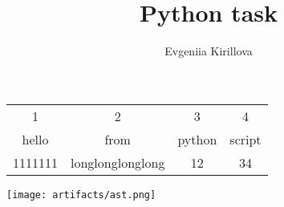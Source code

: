 \documentclass{article}
\title{Python task}
\author{Evgeniia Kirillova}
\begin{document}
\maketitle
\begin{center}\begin{tabular}{cccc}
1 & 2 & 3 & 4\\
hello & from & python & script\\
1111111 & longlonglonglong & 12 & 34
\end{tabular}
\texttt{[image: artifacts/ast.png]}
\end{center}
\end{document}
